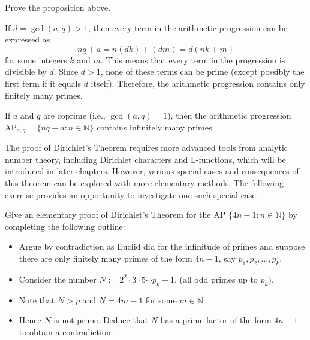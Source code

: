 \documentclass{elegantbook}
\begin{document}
\begin{exercise}
  Prove the proposition above.
\end{exercise}

\begin{solution}
  If $d = \gcd(a, q) > 1$, then every term in the arithmetic progression can be expressed as
  \[
    nq + a = n(dk) + (dm) = d(nk + m)
  \]
  for some integers $k$ and $m$. This means that every term in the progression is divisible by $d$. Since $d > 1$, none of these terms can be prime (except possibly the first term if it equals $d$ itself). Therefore, the arithmetic progression contains only finitely many primes.
\end{solution}


\begin{theorem} \label{thm:PN_in_AP}
  If $a$ and $q$ are coprime (i.e., $\gcd(a, q) = 1$), then the arithmetic progression $\mathrm{AP}_{a,q} = \{nq + a : n \in \mathbb{N}\}$ contains infinitely many primes.
\end{theorem}

The proof of Dirichlet's Theorem requires more advanced tools from analytic number theory, including Dirichlet characters and L-functions, which will be introduced in later chapters. However, various special cases and consequences of this theorem can be explored with more elementary methods. The following exercise provides an opportunity to investigate one such special case.

\begin{exercise}
  Give an elementary proof of Dirichlet's Theorem for the AP $\{ 4n-1: n \in \mathbb{N} \}$ by completing the following outline:
  \begin{itemize}
    \item Argue by contradiction as Euclid did for the infinitude of primes and suppose there are only finitely many primes of the form $4n-1$, say $p_1, p_2, \ldots, p_k$.
    \item Consider the number $N := 2^2 \cdot 3 \cdot 5 \cdots p_k - 1$. (all odd primes up to $p_k$).
    \item Note that $N > p$ and $N = 4m-1$ for some $m \in \mathbb{N}$.
    \item Hence $N$ is not prime. Deduce that $N$ has a prime factor of the form $4n-1$ to obtain a contradiction.
  \end{itemize}
\end{exercise}
\end{document}
